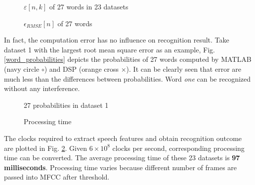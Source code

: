 \begin{figure}[H]
\begin{minipage}[t]{0.5\linewidth}
\centering
{}
\caption{$\varepsilon[n, k]$ of 27 words in 23 datasets}
\label{relative_error}
\end{minipage}
\begin{minipage}[t]{0.5\linewidth}
\centering
{}
\caption{$\epsilon_{RMSE}[n]$ of 27 words}
\label{root_mean_square_error}
\end{minipage}
\end{figure}

In fact, the computation error has no influence on recognition result. Take dataset 1 with the largest root mean square error as an example, Fig. \ref{word_probabilities} depicts the probabilities of 27 words computed by MATLAB (\textcolor{navy_matlab}{navy circle $\circ$}) and DSP (\textcolor{orange_matlab}{orange cross $\times$}). It can be clearly seen that error are much less than the differences between probabilities. Word \textit{one} can be recognized without any interference.

\begin{figure}[H]
\begin{minipage}[t]{0.5\linewidth}
\centering
{}
\caption{27 probabilities in dataset 1}
\label{word_probabilities}
\end{minipage}
\begin{minipage}[t]{0.5\linewidth}
\centering
{}
\caption{Processing time}
\label{processing_time}
\end{minipage}
\end{figure}

The clocks required to extract speech features and obtain recognition outcome are plotted in Fig. \ref{processing_time}. Given $6 \times 10^8$ clocks per second, corresponding processing time can be converted. The average processing time of these 23 datasets is \textbf{97 milliseconds}. Processing time varies because different number of frames are passed into MFCC after threshold.
